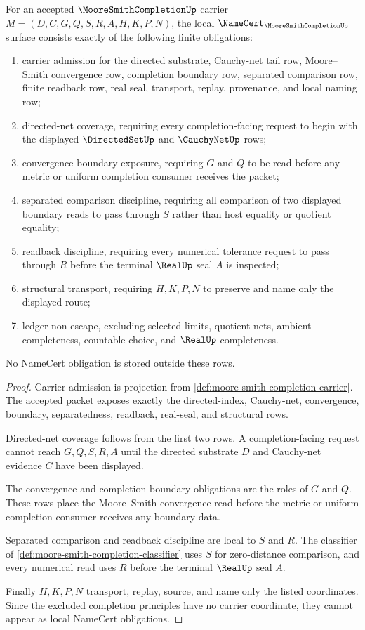\begin{theorem}
\label{thm:moore-smith-completion-namecert-obligations}
For an accepted $\MooreSmithCompletionUp$ carrier $M=(D,C,G,Q,S,R,A,H,K,P,N)$, the local $\NameCert_{\MooreSmithCompletionUp}$ surface consists exactly of the following finite obligations:
\begin{enumerate}
\item carrier admission for the directed substrate, Cauchy-net tail row, Moore--Smith convergence row, completion boundary row, separated comparison row, finite readback row, real seal, transport, replay, provenance, and local naming row;
\item directed-net coverage, requiring every completion-facing request to begin with the displayed $\DirectedSetUp$ and $\CauchyNetUp$ rows;
\item convergence boundary exposure, requiring $G$ and $Q$ to be read before any metric or uniform completion consumer receives the packet;
\item separated comparison discipline, requiring all comparison of two displayed boundary reads to pass through $S$ rather than host equality or quotient equality;
\item readback discipline, requiring every numerical tolerance request to pass through $R$ before the terminal $\RealUp$ seal $A$ is inspected;
\item structural transport, requiring $H,K,P,N$ to preserve and name only the displayed route;
\item ledger non-escape, excluding selected limits, quotient nets, ambient completeness, countable choice, and $\RealUp$ completeness.
\end{enumerate}
No NameCert obligation is stored outside these rows.
\end{theorem}
\begin{proof}
Carrier admission is projection from \autoref{def:moore-smith-completion-carrier}. The accepted packet exposes exactly the directed-index, Cauchy-net, convergence, boundary, separatedness, readback, real-seal, and structural rows.

Directed-net coverage follows from the first two rows. A completion-facing request cannot reach $G,Q,S,R,A$ until the directed substrate $D$ and Cauchy-net evidence $C$ have been displayed.

The convergence and completion boundary obligations are the roles of $G$ and $Q$. These rows place the Moore--Smith convergence read before the metric or uniform completion consumer receives any boundary data.

Separated comparison and readback discipline are local to $S$ and $R$. The classifier of \autoref{def:moore-smith-completion-classifier} uses $S$ for zero-distance comparison, and every numerical read uses $R$ before the terminal $\RealUp$ seal $A$.

Finally $H,K,P,N$ transport, replay, source, and name only the listed coordinates. Since the excluded completion principles have no carrier coordinate, they cannot appear as local NameCert obligations.
\end{proof}

